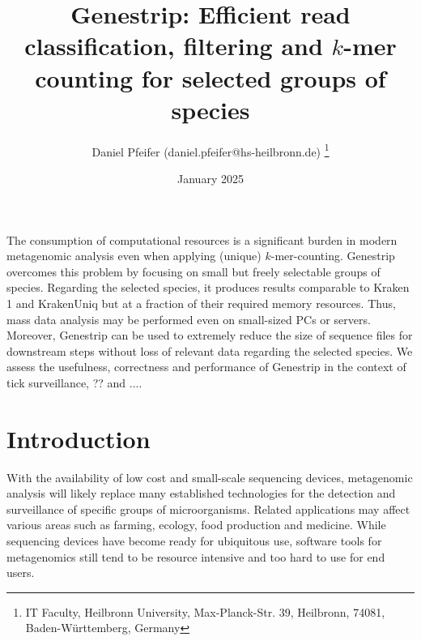\documentclass[letterpaper,11pt,leqno]{article}
\begin{document}
\title{Genestrip: Efficient read classification, filtering and $k$-mer counting for selected groups of species}

\author{Daniel Pfeifer (daniel.pfeifer@hs-heilbronn.de)
%
\thanks{IT Faculty, Heilbronn University, Max-Planck-Str. 39, Heilbronn, 74081, Baden-Württemberg, Germany}}

\date{January 2025}   


\begin{titlepage}
\maketitle

The consumption of computational resources is a significant burden in modern metagenomic analysis even when applying (unique) $k$-mer-counting. Genestrip overcomes this problem by focusing on small but freely selectable groups of species. Regarding the selected species, it produces results comparable to Kraken 1 and KrakenUniq but at a fraction of their required memory resources. Thus, mass data analysis may be performed even on small-sized PCs or servers. Moreover, Genestrip can be used to extremely reduce the size of sequence files for downstream steps without loss of relevant data regarding the selected species. We assess the usefulness, correctness and performance of Genestrip in the context of tick surveillance, ?? and ....

\end{titlepage}

\section{Introduction}

With the availability of low cost and small-scale sequencing devices, metagenomic analysis will likely replace many established technologies for the detection and surveillance of specific groups of microorganisms. Related applications may affect various areas such as farming, ecology, food production and medicine. While sequencing devices have become ready for ubiquitous use, software tools for metagenomics still tend to be resource intensive and too hard to use for end users.
\end{document}
